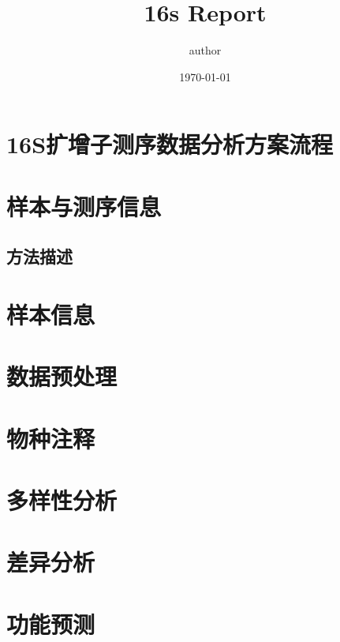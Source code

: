 \documentclass{ctexart}
\title{16s Report}
\author{author}
\date{\today}
\begin{document}
    \maketitle

    \newpage

    \tableofcontents
    
    \setcounter{page}{0}

    \thispagestyle{empty}

    \newpage

    \section{16S扩增子测序数据分析方案流程}


    \section{样本与测序信息}
    \subsection{方法描述}
    \section{样本信息}
    \section{数据预处理}
    \section{物种注释}
    \section{多样性分析}
    \section{差异分析}
    \section{功能预测}
\end{document}
